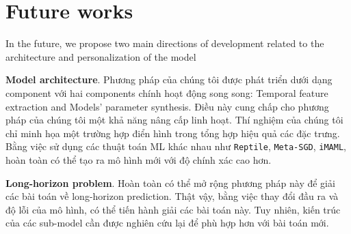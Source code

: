 

\section{Future works}

In the future, we propose two main directions of development related to the architecture and personalization of the model

\textbf{Model architecture}. Phương pháp của chúng tôi được phát triển dưới dạng component với hai components chính hoạt động song song: Temporal feature extraction and Models' parameter synthesis. Điều này cung chấp cho phương pháp của chúng tôi một khả năng nâng cấp linh hoạt. Thí nghiệm của chúng tôi chỉ minh họa một trường hợp điển hình trong tổng hợp hiệu quả các đặc trưng. Bằng việc sử dụng các thuật toán ML khác nhau như \verb|Reptile|, \verb|Meta-SGD|, \verb|iMAML|, hoàn toàn có thể tạo ra mô hình mới với độ chính xác cao hơn.

\textbf{Long-horizon problem}. Hoàn toàn có thể mở rộng phương pháp này để giải các bài toán về long-horizon prediction. Thật vậy, bằng việc thay đổi đầu ra và độ lỗi của mô hình, có thể tiến hành giải các bài toán này. Tuy nhiên, kiến trúc của các sub-model cần được nghiên cứu lại để phù hợp hơn với bài toán mới.
